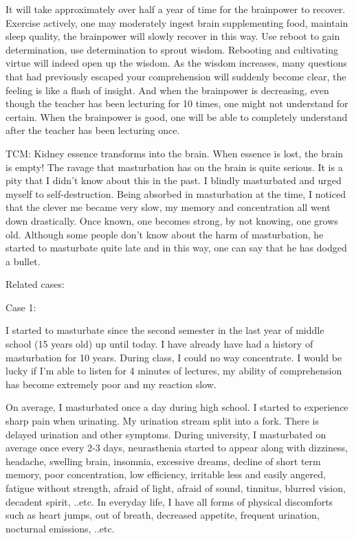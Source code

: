 \documentclass[
]{book}
\begin{document}
It will take approximately over half a year of time for the brainpower to recover. Exercise actively, one may moderately ingest brain supplementing food, maintain sleep quality, the brainpower will slowly recover in this way. Use reboot to gain determination, use determination to sprout wisdom. Rebooting and cultivating virtue will indeed open up the wisdom. As the wisdom increases, many questions that had previously escaped your comprehension will suddenly become clear, the feeling is like a flash of insight. And when the brainpower is decreasing, even though the teacher has been lecturing for 10 times, one might not understand for certain. When the brainpower is good, one will be able to completely understand after the teacher has been lecturing once.

TCM: Kidney essence transforms into the brain. When essence is lost, the brain is empty! The ravage that masturbation has on the brain is quite serious. It is a pity that I didn't know about this in the past. I blindly masturbated and urged myself to self-destruction. Being absorbed in masturbation at the time, I noticed that the clever me became very slow, my memory and concentration all went down drastically. Once known, one becomes strong, by not knowing, one grows old. Although some people don't know about the harm of masturbation, he started to masturbate quite late and in this way, one can say that he has dodged a bullet.

Related cases:

Case 1:

I started to masturbate since the second semester in the last year of middle school (15 years old) up until today. I have already have had a history of masturbation for 10 years. During class, I could no way concentrate. I would be lucky if I'm able to listen for 4 minutes of lectures, my ability of comprehension has become extremely poor and my reaction slow.

On average, I masturbated once a day during high school. I started to experience sharp pain when urinating. My urination stream split into a fork. There is delayed urination and other symptoms. During university, I masturbated on average once every 2-3 days, neurasthenia started to appear along with dizziness, headache, swelling brain, insomnia, excessive dreams, decline of short term memory, poor concentration, low efficiency, irritable less and easily angered, fatigue without strength, afraid of light, afraid of sound, tinnitus, blurred vision, decadent spirit, ..etc. In everyday life, I have all forms of physical discomforts such as heart jumps, out of breath, decreased appetite, frequent urination, nocturnal emissions, ..etc.
\end{document}
